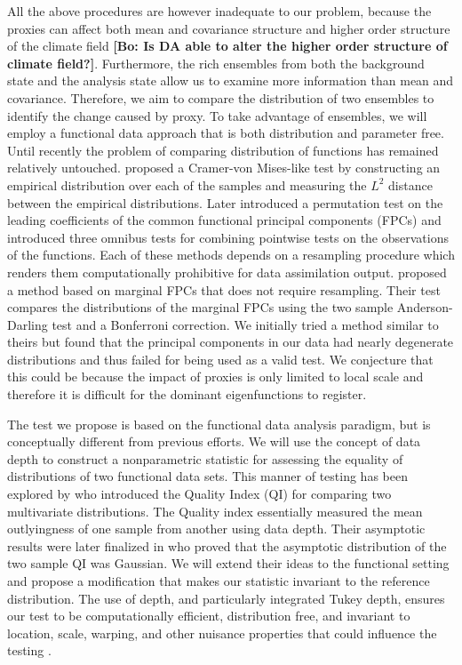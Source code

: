 \documentclass[12pt]{article}
\newcommand{\bl}[1]{\color{Red}\textbf{[Bo: #1]}\normalcolor}
\begin{document}
All the above procedures are however inadequate to our problem, because the proxies can affect both mean and covariance structure and higher order structure of the climate field \bl{Is DA able to alter the higher order structure of climate field?}. Furthermore, the rich ensembles from both the background state and the analysis state allow us to examine more information than mean and covariance. Therefore, we aim to compare the distribution of two ensembles to identify the change caused by proxy. To take advantage of ensembles, we will employ a functional data approach that is both distribution and parameter free. Until recently the problem of comparing distribution of functions has remained relatively untouched. \citet{hall} proposed a Cramer-von Mises-like test by constructing an empirical distribution over each of the samples and measuring the $L^2$ distance between the empirical distributions. Later \citet{benko} introduced a permutation test on the leading coefficients of the common functional principal components (FPCs) and  \citet{corain} introduced three omnibus tests for combining pointwise tests on the observations of the functions. Each of these methods depends on a resampling procedure which renders them computationally prohibitive for data assimilation output.\citet{staicu} proposed a method based on marginal FPCs that does not require resampling. Their test compares the distributions of the marginal FPCs using the two sample Anderson-Darling test and a Bonferroni correction. We initially tried a method similar to theirs but found that the principal components in our data had nearly degenerate distributions and thus failed for being used as a valid test. We conjecture that this could be because the impact of proxies is only limited to local scale and therefore it is difficult for the dominant eigenfunctions to register.

The test we propose is based on the functional data analysis paradigm, but is conceptually different from previous efforts. We will use the concept of data depth to construct a nonparametric statistic for assessing the equality of distributions of two functional data sets. This manner of testing has been explored by \citet{quality} who introduced the Quality Index (QI) for comparing two multivariate distributions. The Quality index essentially measured the mean outlyingness of one sample from another using data depth. Their asymptotic results were later finalized in \citet{xuming} who proved that the asymptotic distribution of the two sample QI was Gaussian. We will extend their ideas to the functional setting and propose a modification that makes our statistic invariant to the reference distribution. The use of depth, and particularly integrated Tukey depth, ensures our test to be computationally efficient, distribution free, and invariant to location, scale, warping, and other nuisance properties that could influence the testing \citep{nagy}.
\end{document}
